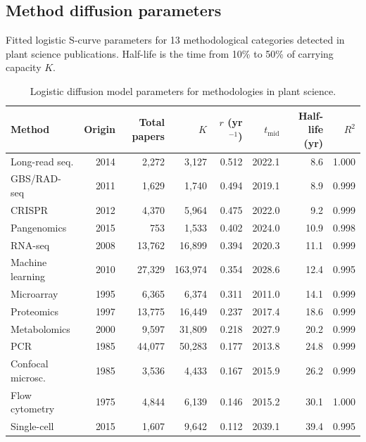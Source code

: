 \subsection*{Method diffusion parameters}

Fitted logistic S-curve parameters for 13 methodological categories detected
in plant science publications. Half-life is the time from 10\% to 50\% of
carrying capacity $K$.

\begin{table}[H]
\centering
\caption{Logistic diffusion model parameters for methodologies in plant science.}
\label{tab:si-logistic-diffusion}
\begin{tabular}{lrrrrrrr}
\toprule
Method & Origin & Total papers & $K$ & $r$ (yr$^{-1}$) & $t_{\mathrm{mid}}$ & Half-life (yr) & $R^2$ \\
\midrule
Long-read seq.    & 2014 & 2,272  & 3,127   & 0.512 & 2022.1 & 8.6  & 1.000 \\
GBS/RAD-seq       & 2011 & 1,629  & 1,740   & 0.494 & 2019.1 & 8.9  & 0.999 \\
CRISPR            & 2012 & 4,370  & 5,964   & 0.475 & 2022.0 & 9.2  & 0.999 \\
Pangenomics       & 2015 & 753    & 1,533   & 0.402 & 2024.0 & 10.9 & 0.998 \\
RNA-seq           & 2008 & 13,762 & 16,899  & 0.394 & 2020.3 & 11.1 & 0.999 \\
Machine learning  & 2010 & 27,329 & 163,974 & 0.354 & 2028.6 & 12.4 & 0.995 \\
Microarray        & 1995 & 6,365  & 6,374   & 0.311 & 2011.0 & 14.1 & 0.999 \\
Proteomics        & 1997 & 13,775 & 16,449  & 0.237 & 2017.4 & 18.6 & 0.999 \\
Metabolomics      & 2000 & 9,597  & 31,809  & 0.218 & 2027.9 & 20.2 & 0.999 \\
PCR               & 1985 & 44,077 & 50,283  & 0.177 & 2013.8 & 24.8 & 0.999 \\
Confocal microsc. & 1985 & 3,536  & 4,433   & 0.167 & 2015.9 & 26.2 & 0.999 \\
Flow cytometry    & 1975 & 4,844  & 6,139   & 0.146 & 2015.2 & 30.1 & 1.000 \\
Single-cell       & 2015 & 1,607  & 9,642   & 0.112 & 2039.1 & 39.4 & 0.995 \\
\bottomrule
\end{tabular}
\end{table}


